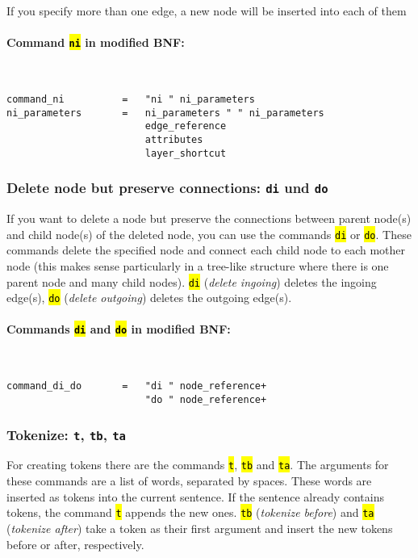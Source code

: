 \documentclass[12pt]{scrartcl}
\newcommand{\code}[1]{\hl{\texttt{#1}}}
\begin{document}
If you specify more than one edge, a new node will be inserted into each of them

\paragraph*{Command \code{ni} in modified BNF:}
~
\begin{lstlisting}
command_ni          =   "ni " ni_parameters
ni_parameters       =   ni_parameters " " ni_parameters
                        edge_reference
                        attributes
                        layer_shortcut
\end{lstlisting}


\subsubsection{Delete node but preserve connections: \texttt{di} und \texttt{do}}

If you want to delete a node but preserve the connections between parent node(s) and child node(s) of the deleted node, you can use the commands \code{di} or \code{do}.
These commands delete the specified node and connect each child node to each mother node (this makes sense particularly in a tree-like structure where there is one parent node and many child nodes).
\code{di} (\textit{delete ingoing}) deletes the ingoing edge(s), \code{do} (\textit{delete outgoing}) deletes the outgoing edge(s).

\paragraph*{Commands \code{di} and \code{do} in modified BNF:}
~
\begin{lstlisting}
command_di_do       =   "di " node_reference+
                        "do " node_reference+
\end{lstlisting}


\subsubsection{Tokenize: \texttt{t}, \texttt{tb}, \texttt{ta}}

For creating tokens there are the commands \code{t}, \code{tb} and \code{ta}.
The arguments for these commands are a list of words, separated by spaces.
These words are inserted as tokens into the current sentence.
If the sentence already contains tokens, the command \code{t} appends the new ones.
\code{tb} (\textit{tokenize before}) and \code{ta} (\textit{tokenize after}) take a token as their first argument and insert the new tokens before or after, respectively.
\end{document}
